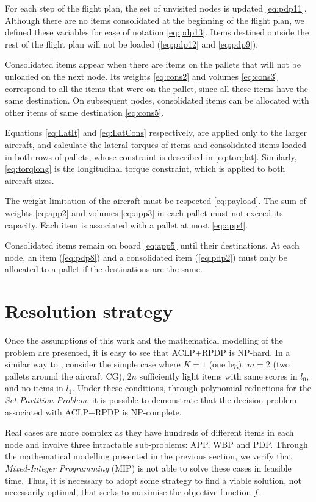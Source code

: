 \documentclass[preprint,authoryear]{elsarticle}
\begin{document}
For each step of the flight plan, the set of unvisited nodes is updated \ref{eq:pdp11}. Although there are no items consolidated at the beginning of the flight plan, we defined these variables for ease of notation \ref{eq:pdp13}. Items destined outside the rest of the flight plan will not be loaded (\ref{eq:pdp12} and \ref{eq:pdp9}).

Consolidated items appear when there are items on the pallets that will not be unloaded on the next node. Its weights \ref{eq:cons2} and volumes \ref{eq:cons3} correspond to all the items that were on the pallet, since all these items have the same destination. On subsequent nodes, consolidated items can be allocated with other items of same destination \ref{eq:cons5}.

Equations \ref{eq:LatIt} and \ref{eq:LatCons} respectively, are applied only to the larger aircraft, and calculate the lateral torques of items and consolidated items loaded in both rows of pallets, whose constraint is described in \ref{eq:torqlat}. Similarly, \ref{eq:torqlong} is the longitudinal torque constraint, which is applied to both aircraft sizes.

The weight limitation of the aircraft must be respected \ref{eq:payload}. The sum of weights \ref{eq:app2} and volumes \ref{eq:app3} in each pallet must not exceed its capacity. Each item is associated with a pallet at most \ref{eq:app4}.

Consolidated items remain on board \ref{eq:app5} until their destinations. At each node, an item (\ref{eq:pdp8}) and a consolidated item (\ref{eq:pdp2}) must only be allocated to a pallet if the destinations are the same.


\section{Resolution strategy}
\label{sec5}

Once the assumptions of this work and the mathematical modelling of the problem are presented, it is easy to see that ACLP+RPDP is NP-hard. In a similar way to \cite[p. 6]{LurkinSchyns2015}, consider the simple case where $K=1$\/ (one leg), $m=2$ (two pallets around the aircraft CG), $2n$\/ sufficiently light items with same scores in $l_0$, and no items in $l_1$. Under these conditions, through polynomial reductions for the {\it Set-Partition Problem}, it is possible to demonstrate that the decision problem associated with ACLP+RPDP is NP-complete.

Real cases are more complex as they have hundreds of different items in each node and involve three intractable sub-problems: APP, WBP and PDP. Through the mathematical modelling presented in the previous section, we verify that {\it Mixed-Integer Programming}\/ (MIP) is not able to solve these cases in feasible time. Thus, it is necessary to adopt some strategy to find a viable solution, not necessarily optimal, that seeks to maximise the objective function $f$.
\end{document}
